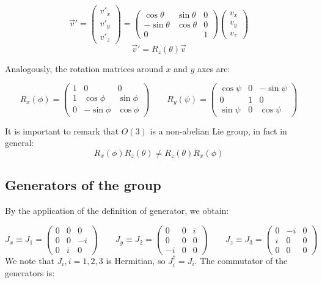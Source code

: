 \documentclass[../../main/main.tex]{subfiles}
\begin{document}
\begin{equation*}
	\vec{v}' =
	\begin{pmatrix}
		v'_x	\\	v'_y	\\	v'_z
	\end{pmatrix}
	=
	\begin{pmatrix}
		\cos{\theta}	&	\sin{\theta}	&	0	\\
		-\sin{\theta}	&	\cos{\theta}	&	0	\\
		0				&					&	1
	\end{pmatrix}
	\begin{pmatrix}
		v_x	\\	v_y	\\	v_z
	\end{pmatrix}
\end{equation*}
\begin{equation*}
	\vec{v}' = R_z(\theta)\vec{v}
\end{equation*}

Analogously, the rotation matrices around $x$ and $y$ axes are:

\begin{equation*}
	R_x(\phi) =
	\begin{pmatrix}
		1	&	0				&	0				\\
		1	&	\cos{\phi}	&	\sin{\phi}	\\
		0	&	-\sin{\phi}	&	\cos{\phi}
	\end{pmatrix}
	\qquad
	R_y(\psi) =
	\begin{pmatrix}
		\cos{\psi}	&	0		&	-\sin{\psi}		\\
		0			&	1		&	0				\\
		\sin{\psi}	&	0		&	\cos{\psi}
	\end{pmatrix}
\end{equation*}

It is important to remark that $O(3)$ is a non-abelian Lie group, in fact in general:
\[
	R_x(\phi) R_z(\theta) \ne R_z(\theta) R_x(\phi)
\]



\subsection{Generators of the group}
By the application of the definition of generator, we obtain:

\[
	J_x \equiv J_1 =
	\begin{pmatrix}
		0	&	0	&	0	\\
		0	&	0	&	-i	\\
		0	&	i	&	0
	\end{pmatrix}
	\qquad
	J_y \equiv J_2 =
	\begin{pmatrix}
		0	&	0	&	i	\\
		0	&	0	&	0	\\
		-i	&	0	&	0
	\end{pmatrix}
	\qquad
	J_z \equiv J_3 =
	\begin{pmatrix}
		0	&	-i	&	0	\\
		i	&	0	&	0	\\
		0	&	0	&	0
	\end{pmatrix}
\]
We note that $J_i, i=1,2,3$ is Hermitian, so $J_i^{\dagger} = J_i$. The commutator of the generators is:
\end{document}
